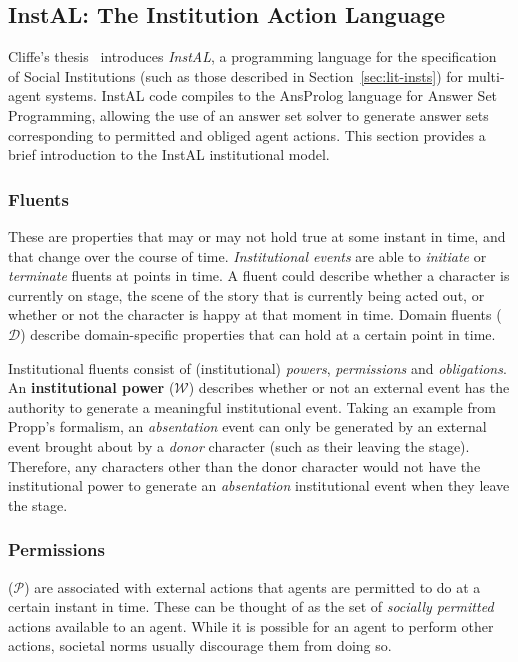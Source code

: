 \documentclass[11pt]{report}
\newcommand{\added}[2]{%
  \todo[noline,bordercolor=white,color=green,size=\scriptsize]{#2}
  \cbcolor{green}
  \begin{changebar}
    #1
  \end{changebar}%
  }%
\newcommand{\added}[2]{#1}
\begin{document}
\subsection{InstAL: The Institution Action Language}
\label{sec:instal-intro}
\added{
}{2.4.2: Introduction to InstAL}
Cliffe's thesis~\citep{cliffe2007specifying} introduces \emph{InstAL}, a
programming language for the specification of Social Institutions (such as those
described in Section~\ref{sec:lit-insts}) for multi-agent systems. InstAL code
compiles to the AnsProlog language for Answer Set Programming, allowing the use
of an answer set solver to generate answer sets corresponding to permitted and
obliged agent actions. This section provides a brief introduction to the InstAL
institutional model.

\subsubsection{Fluents}
These are properties that may or may not hold true at some instant in time, and that change over the course of time. \emph{Institutional events} are able to \emph{initiate} or \emph{terminate} fluents at points in time. A fluent could describe whether a character is currently on stage, the scene of the story that is currently being acted out, or whether or not the character is happy at that moment in time.
Domain fluents ($\mathcal{D}$) describe domain-specific properties that can hold at a certain point in time. 

Institutional fluents consist of (institutional) \emph{powers}, \emph{permissions} and \emph{obligations}.
An \textbf{institutional power} ($\mathcal{W}$) describes whether or not an external event has the authority to generate a meaningful institutional event. Taking an example from Propp's formalism, an \emph{absentation\/} event can only be generated by an external event brought about by a \emph{donor\/} character (such as their leaving the stage). Therefore, any characters other than the donor character would not have the institutional power to generate an \emph{absentation\/} institutional event when they leave the stage.

\subsubsection{Permissions} ($\mathcal{P}$) are associated with external actions that agents are permitted to do at a certain instant in time. These can be thought of as the set of \emph{socially permitted\/} actions available to an agent. While it is possible for an agent to perform other actions, societal norms usually discourage them from doing so.
\end{document}
